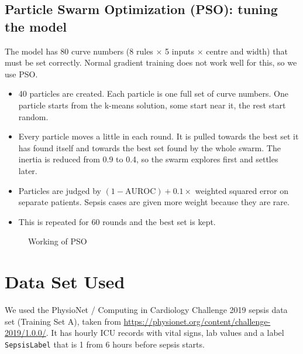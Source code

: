 \documentclass[11pt,a4paper]{article}
\begin{document}
\subsection{Particle Swarm Optimization (PSO): tuning the model}
The model has 80 curve numbers (8 rules $\times$ 5 inputs $\times$ centre and width) that must be set correctly. Normal gradient training does not work well for this, so we use PSO.
\begin{itemize}[nosep]
\item 40 particles are created. Each particle is one full set of curve numbers. One particle starts from the k-means solution, some start near it, the rest start random.
\item Every particle moves a little in each round. It is pulled towards the best set it has found itself and towards the best set found by the whole swarm. The inertia is reduced from 0.9 to 0.4, so the swarm explores first and settles later.
\item Particles are judged by $(1-\text{AUROC}) + 0.1\times$ weighted squared error on separate patients. Sepsis cases are given more weight because they are rare.
\item This is repeated for 60 rounds and the best set is kept.
\end{itemize}

\begin{figure}[H]
\centering
{}
\caption{Working of PSO}
\end{figure}

\section{Data Set Used}
We used the PhysioNet / Computing in Cardiology Challenge 2019 sepsis data set (Training Set A), taken from \url{https://physionet.org/content/challenge-2019/1.0.0/}. It has hourly ICU records with vital signs, lab values and a label \texttt{SepsisLabel} that is 1 from 6 hours before sepsis starts.
\end{document}
